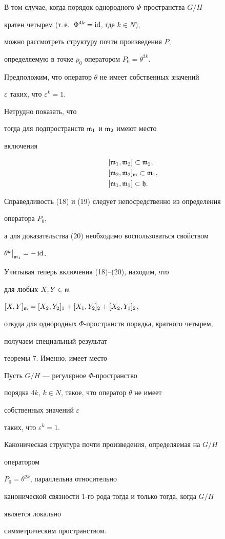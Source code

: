  


В том случае, когда порядок однородного $\Phi$-пространства $G/H$ 


кратен четырем (т.\,е.~$\Phi^{4k}=\operatorname{id}$, где $k\in N$), 


можно рассмотреть структуру почти произведения $P$, 


определяемую в точке $p_0$ оператором $P_0=\theta^{2k}$. 


Предположим, что оператор $\theta$ не имеет собственных значений 


$\varepsilon$ таких, что $\varepsilon^k=1$. 


Нетрудно показать, что  


тогда для подпространств $\frak m_1$ и $\frak m_2$ имеют место 


включения 


\begin{align} 


&[\frak m_1,\frak m_2]\subset \frak m_2, \\ 


&[\frak m_2,\frak m_2]_{\frak m} \subset\frak m_1, \\ 


&[\frak m_1,\frak m_1]\subset \frak h. 


\end{align} 


Справедливость (18) и (19) следует непосредственно из определения 


оператора $P_0$, 


а для доказательства (20) необходимо воспользоваться свойством 


$\theta^k\big|_{\frak m_1}=-\operatorname{id}$.


Учитывая теперь включения (18)--(20), находим, что 


для любых $X,Y\in\frak m$\; 


$[X,Y]_{\frak m}=[X_2,Y_2]_1+[X_1,Y_2]_2+[X_2,Y_1]_2$, 


откуда для однородных $\Phi$-пространств порядка, кратного четырем,


получаем специальный результат 


теоремы 7. Именно, имеет место 


 


\begin{thm} Пусть $G/H$ --- регулярное $\Phi$-пространство 


порядка $4k$, $k\in N$, такое, что оператор $\theta$ не имеет 


собственных значений $\varepsilon$ 


таких, что $\varepsilon^k=1$. 


Каноническая структура почти произведения, определяемая на $G/H$ 


оператором 


$P_0=\theta^{2k}$, параллельна относительно 


канонической связности $1$-го рода тогда и только тогда, когда $G/H$


является локально 


симметрическим пространством. 


\end{thm} 


